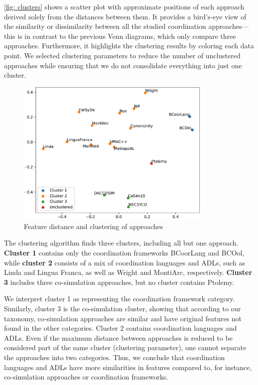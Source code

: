 \documentclass[runningheads]{llncs}
\begin{document}
\autoref{fig: clusters} shows a scatter plot with approximate positions of each approach derived solely from the distances between them.
It provides a bird's-eye view of the similarity or dissimilarity between all the studied coordination approaches---this is in contrast to the previous Venn diagrams, which only compare three approaches.
Furthermore, it highlights the clustering results by coloring each data point.
We selected clustering parameters to reduce the number of unclustered approaches while ensuring that we do not consolidate everything into just one cluster.
%
\begin{figure}[ht]
	\centering
	\includegraphics[width=0.835\textwidth]{images/approach_scatter}
    \caption{Feature distance and clustering of approaches}
	\label{fig: clusters}
\end{figure}

The clustering algorithm finds three clusters, including all but one approach.
\textbf{Cluster 1} contains only the coordination frameworks BCoorLang and BCOol, 
while \textbf{cluster 2} consists of a mix of coordination languages and ADLs, such as Linda and Lingua Franca, as well as Wright and MontiArc, respectively.
\textbf{Cluster 3} includes three co-simulation approaches, but no cluster contains Ptolemy.

We interpret cluster 1 as representing the coordination framework category.
Similarly, cluster 3 is the co-simulation cluster, showing that according to our taxonomy, co-simulation approaches are similar and have original features not found in the other categories.
Cluster 2 contains coordination languages and ADLs.
Even if the maximum distance between approaches is reduced to be considered part of the same cluster (clustering parameter), one cannot separate the approaches into two categories.
Thus, we conclude that coordination languages and ADLs have more similarities in features compared to, for instance, co-simulation approaches or coordination frameworks.
\end{document}
